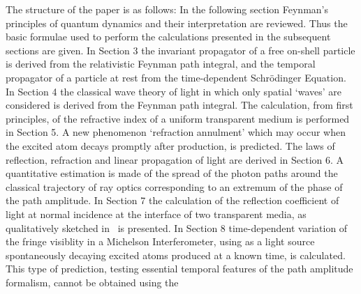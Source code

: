     \par The structure of the paper is as follows: In the following section Feynman's principles
    of quantum dynamics and their interpretation are reviewed. Thus the basic formulae used
   to perform the calculations presented in the subsequent sections are given. In Section 3
    the invariant propagator of a free on-shell particle is derived from the relativistic
    Feynman path integral, and the temporal propagator of a particle
    at rest from the time-dependent Schr\"{o}dinger Equation.
   In Section 4 the classical wave theory of light in which only
    spatial `waves' are considered is derived from the Feynman path integral. The calculation,
     from first principles, of the refractive index of a uniform transparent medium is 
    performed in Section 5. A new phenomenon `refraction annulment' which may occur when the
    excited atom decays promptly after production, is predicted. The laws of reflection, refraction
    and linear propagation of light are derived in Section 6. A quantitative estimation is made
   of the spread of the photon paths around the classical trajectory of ray optics corresponding
   to an extremum of the phase of the path amplitude. In Section 7 the calculation of the
    reflection coefficient of light at normal incidence at the interface of two transparent
   media, as qualitatively sketched in~\cite{Feyn1} is presented.  In Section 8 time-dependent
   variation of the fringe visiblity in a Michelson Interferometer, using as a light source
   spontaneously decaying excited atoms produced at a known time, is calculated.
   This type of prediction, testing
   essential temporal features of the path amplitude formalism, cannot be obtained using the
